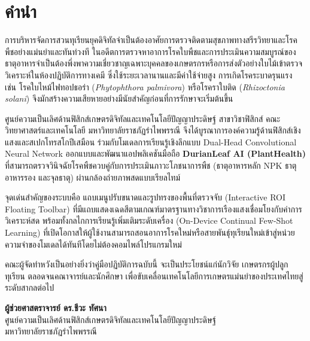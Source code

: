 \chapter*{คำนำ}

การบริหารจัดการสวนทุเรียนยุคดิจิทัลจำเป็นต้องอาศัยการตรวจติดตามสุขภาพทางสรีรวิทยาและโรคพืชอย่างแม่นยำและทันท่วงที ในอดีตการตรวจหาอาการโรคใบพืชและการประเมินความสมบูรณ์ของธาตุอาหารจำเป็นต้องพึ่งพาความเชี่ยวชาญเฉพาะบุคคลของเกษตรกรหรือการส่งตัวอย่างใบไม้เข้าตรวจวิเคราะห์ในห้องปฏิบัติการทางเคมี ซึ่งใช้ระยะเวลานานและมีค่าใช้จ่ายสูง การเกิดโรคระบาดรุนแรง เช่น โรคใบไหม้ไฟทอปธอร่า (\textit{Phytophthora palmivora}) หรือโรคราใบติด (\textit{Rhizoctonia solani}) จึงมักสร้างความเสียหายอย่างมีนัยสำคัญก่อนที่การรักษาจะเริ่มต้นขึ้น

ศูนย์ความเป็นเลิศด้านฟิสิกส์เกษตรดิจิทัลและเทคโนโลยีปัญญาประดิษฐ์ สาขาวิชาฟิสิกส์ คณะวิทยาศาสตร์และเทคโนโลยี มหาวิทยาลัยราชภัฏรำไพพรรณี จึงได้บูรณาการองค์ความรู้ด้านฟิสิกส์เชิงแสงและสเปกโทรสโกปีเสมือน ร่วมกับโมเดลการเรียนรู้เชิงลึกแบบ Dual-Head Convolutional Neural Network ออกแบบและพัฒนาแอปพลิเคชันมือถือ \textbf{DurianLeaf AI (PlantHealth)} ที่สามารถตรวจวินิจฉัยโรคพืชควบคู่กับการประเมินภาวะโภชนาการพืช (ธาตุอาหารหลัก NPK ธาตุอาหารรอง และจุลธาตุ) ผ่านกล้องถ่ายภาพสดแบบเรียลไทม์

จุดเด่นสำคัญของระบบคือ แถบเมนูปรับขนาดและรูปทรงของพื้นที่ตรวจจับ (Interactive ROI Floating Toolbar) ที่มีแถบแสดงเฉดสีตามเกณฑ์มาตรฐานทางวิชาการเรืองแสงเชื่อมโยงกับค่าการวิเคราะห์สด พร้อมทั้งกลไกการเรียนรู้เพิ่มเติมระดับเครื่อง (On-Device Continual Few-Shot Learning) ที่เปิดโอกาสให้ผู้ใช้งานสามารถสอนอาการโรคใหม่หรือสายพันธุ์ทุเรียนใหม่เข้าสู่หน่วยความจำของโมเดลได้ทันทีโดยไม่ต้องคอมไพล์โปรแกรมใหม่

คณะผู้จัดทำหวังเป็นอย่างยิ่งว่าคู่มือปฏิบัติการฉบับนี้ จะเป็นประโยชน์แก่นักวิจัย เกษตรกรผู้ปลูกทุเรียน ตลอดจนคณาจารย์และนักศึกษา เพื่อขับเคลื่อนเทคโนโลยีการเกษตรแม่นยำของประเทศไทยสู่ระดับสากลต่อไป

\vspace{1.5cm}

\begin{flushright}
  \textbf{ผู้ช่วยศาสตราจารย์ ดร.ชีวะ ทัศนา}\\
  ศูนย์ความเป็นเลิศด้านฟิสิกส์เกษตรดิจิทัลและเทคโนโลยีปัญญาประดิษฐ์\\
  มหาวิทยาลัยราชภัฏรำไพพรรณี
\end{flushright}
